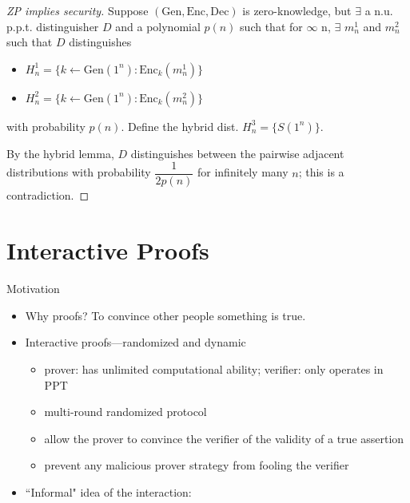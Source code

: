\begin{frame}
\begin{proof}[ZP implies security]
    Suppose $(\mathrm{Gen}, \mathrm{Enc}, \mathrm{Dec})$ is zero-knowledge, but $\exists$ a n.u. p.p.t. distinguisher $D$ and a polynomial $p(n)$ such that for $\infty$ n, $\exists$ $m_n^1$ and $m_n^2$ such that $D$ distinguishes
    \begin{itemize}
        \item $H_n^1 = \{k \leftarrow \mathrm{Gen}(1^n): \mathrm{Enc}_k(m_n^1)\}$
        \item $H_n^2 = \{k \leftarrow \mathrm{Gen}(1^n): \mathrm{Enc}_k(m_n^2)\}$
    \end{itemize}
    with probability $p(n)$. Define the hybrid dist. $H_n^3 = \{S(1^n)\}.$
    
    By the hybrid lemma, $D$ distinguishes between the pairwise adjacent distributions with probability $\dfrac{1}{2p(n)}$ for infinitely many $n$; this is a contradiction.
\end{proof}
\end{frame}

\section{Interactive Proofs}
\begin{frame}{Motivation}
    \begin{itemize}[<+->]
        \item Why proofs? To convince other people something is true.
        \item Interactive proofs---randomized and dynamic
        \begin{itemize}
            \item prover: has unlimited computational ability; verifier: only operates in PPT
            \item multi-round randomized protocol
            \item allow the prover to convince the verifier of the validity of a true assertion
            \item prevent any malicious prover strategy from fooling the verifier
        \end{itemize}
        \item ``Informal" idea of the interaction:
        \vspace{-6pt}
    \end{itemize}
\end{frame}

